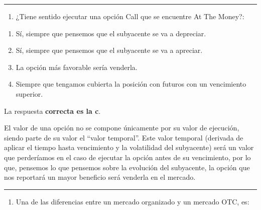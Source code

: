 \documentclass[
  letterpaper,
  DIV=11,
  numbers=noendperiod]{scrreprt}
\providecommand{\tightlist}{%
  \setlength{\itemsep}{0pt}\setlength{\parskip}{0pt}}\usepackage{longtable,booktabs,array}
\begin{document}
\begin{center}\rule{0.5\linewidth}{0.5pt}\end{center}

\begin{enumerate}
\def\labelenumi{\arabic{enumi}.}
\setcounter{enumi}{10}
\tightlist
\item
  ¿Tiene sentido ejecutar una opción Call que se encuentre At The
  Money?:
\end{enumerate}

\begin{enumerate}
\def\labelenumi{\alph{enumi})}
\item
  Sí, siempre que pensemos que el subyacente se va a depreciar.
\item
  Sí, siempre que pensemos que el subyacente se va a apreciar.
\item
  La opción más favorable sería venderla.
\item
  Siempre que tengamos cubierta la posición con futuros con un
  vencimiento superior.
\end{enumerate}

\begin{tcolorbox}[enhanced jigsaw, left=2mm, opacityback=0, colback=white, breakable, arc=.35mm, bottomrule=.15mm, rightrule=.15mm, toprule=.15mm, leftrule=.75mm, colframe=quarto-callout-tip-color-frame]
\begin{minipage}[t]{5.5mm}
\textcolor{quarto-callout-tip-color}{\faLightbulb}
\end{minipage}%
\begin{minipage}[t]{\textwidth - 5.5mm}

La respuesta \textbf{correcta es la c}.

El valor de una opción no se compone únicamente por su valor de
ejecución, siendo parte de su valor el ``valor temporal''. Este valor
temporal (derivada de aplicar el tiempo hasta vencimiento y la
volatilidad del subyacente) será un valor que perderíamos en el caso de
ejecutar la opción antes de su vencimiento, por lo que, pensemos lo que
pensemos sobre la evolución del subyacente, la opción que nos reportará
un mayor beneficio será venderla en el mercado.

\end{minipage}%
\end{tcolorbox}

\begin{center}\rule{0.5\linewidth}{0.5pt}\end{center}

\begin{enumerate}
\def\labelenumi{\arabic{enumi}.}
\setcounter{enumi}{11}
\tightlist
\item
  Una de las diferencias entre un mercado organizado y un mercado OTC,
  es:
\end{enumerate}
\end{document}
